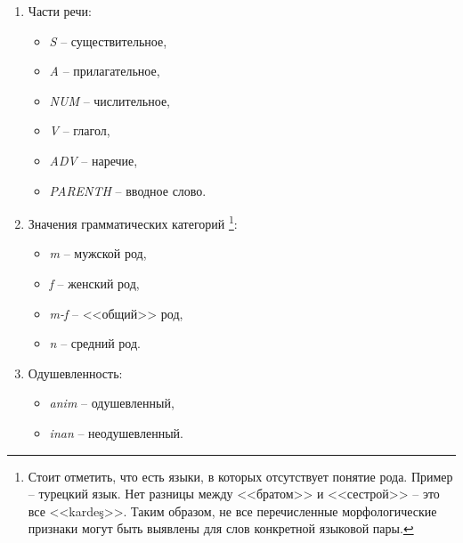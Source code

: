 \begin{enumerate}
	\item Части речи:
	
	\begin{itemize}[label=---]
		\item \textit{S} -- существительное,
		
		\item \textit{A} -- прилагательное,
		
		\item \textit{NUM} -- числительное,
		
		\item \textit{V} -- глагол,
		
		\item \textit{ADV} -- наречие,
		
		\item \textit{PARENTH} -- вводное слово.\\
	\end{itemize}
	
	\item Значения грамматических категорий \footnote{
	Стоит отметить, что есть языки, в которых отсутствует понятие рода. 
	Пример -- турецкий язык. 
	Нет разницы между <<братом>> и <<сестрой>> -- это все <<kardeş>>. 
	Таким образом, не все перечисленные морфологические признаки могут быть выявлены для слов конкретной языковой пары.}:
	
	\begin{itemize}[label=---]
		\item \textit{m} -- мужской род,
		
		\item \textit{f} -- женский род,
		
		\item \textit{m-f} -- <<общий>> род,
		
		\item \textit{n} -- средний род.
	\end{itemize}

	\item Одушевленность:
	
	\begin{itemize}[label=---]
		\item \textit{anim} -- одушевленный,
		
		\item \textit{inan} -- неодушевленный.
	\end{itemize}

\end{enumerate}

